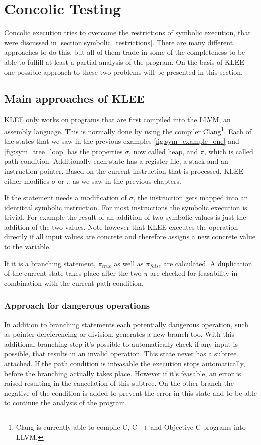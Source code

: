 \section{Concolic Testing} \label{section:concolic_testing}
Concolic execution tries to overcome the restrictions of symbolic execution, that were discussed in \ref{section:symbolic_restrictions}. There are many different approaches to do this, but all of them trade in some of the completeness to be able to fulfill at least a partial analysis of the program.
On the basis of KLEE \cite{Cadar:2008:KUA:1855741.1855756} one possible approach to these two problems will be presented in this section.

\subsection{Main approaches of KLEE}
KLEE only works on programs that are first compiled into the LLVM, an assembly language. This is normally done by using the compiler Clang\footnote{Clang is currently able to compile C, C++  and Objective-C programs into LLVM.}. 
Each of the states that we saw in the previous examples \ref{fig:sym_example_one} and \ref{fig:sym_tree_loop} has the properties $\sigma$, now called heap, and $\pi$, which is called path condition. Additionally each state has a register file, a stack and an instruction pointer. Based on the current instruction that is processed, KLEE either modifies $\sigma$ or $\pi$ as we saw in the previous chapters.

If the statement needs a modification of $\sigma$, the instruction gets mapped into an identitcal symbolic instruction. For most instructions the symbolic execution is trivial. For example the result of an addition of two symbolic values is just the addition of the two values. Note however that KLEE executes the operation directly if all input values are concrete and therefore assigns a new concrete value to the variable.

If it is a branching statement, $\pi_{true}$ as well as $\pi_{false}$ are calculated. A duplication of the current state takes place after the two $\pi$ are checked for feasability in combination with the current path condition.

\subsubsection{Approach for dangerous operations}
In addition to branching statements each potentially dangerous operation, such as pointer dereferencing or division, generates a new branch too. With this additional branching step it's possible to automatically check if any input is possible, that results in an invalid operation. This state never has a subtree attached. If the path condition is infeasable the execution stops automatically, before the branching actually takes place. However if it's feasable, an error is raised resulting in the cancelation of this subtree. On the other branch the negative of the condition is added to prevent the error in this state and to be able to continue the analysis of the program.


